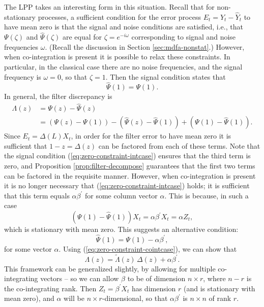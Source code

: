 \documentclass[a4paper]{book}
\begin{document}
 The LPP takes an interesting form in this situation. Recall that for non-stationary 
 processes, a sufficient condition for the error process $E_t = Y_t - \widehat{Y}_t$ 
 to have mean zero is that the signal and noise conditions are satisfied, 
 i.e., that $\Psi (\zeta)$ and $\widehat{\Psi} (\zeta)$ are equal for 
 $\zeta = e^{- i \omega}$  corresponding to signal and noise frequencies $\omega$. 
 (Recall the discussion in Section \ref{sec:mdfa-nonstat}.)  However, when 
 co-integration is present it is possible to relax these constraints.
 In particular, in the classical case there are no noise frequencies, and the
  signal frequency is $\omega = 0$, so that $\zeta =1$.  Then the signal condition states
  that
  \begin{equation}
  \label{eq:zero-constraint-intcase}
   \widehat{\Psi} (1) = \Psi (1).
  \end{equation}
  In general, the filter discrepancy is
\begin{align*}
 \Lambda (z) & =  \Psi (z) - \widehat{\Psi} (z) \\
  & = \left( \Psi (z) - \Psi (1) \right) 
   - \left( \widehat{\Psi} (z) - \widehat{\Psi} (1) \right) +
    \left( \Psi (1) - \widehat{\Psi} (1) \right).
  \end{align*}
 Since $E_t = \Delta (L) X_t$, in order for the  filter error to have mean zero
  it is sufficient that  $1-z = \Delta (z)$ can be factored from each of these terms.
  Note that the signal condition (\ref{eq:zero-constraint-intcase}) ensures
  that the third term is zero, and 
  Proposition \ref{prop:filter-decompose} guarantees that the first two terms can
  be factored in the requisite manner.  However, when co-integration is present 
  it is no longer necessary that (\ref{eq:zero-constraint-intcase}) holds; it is sufficient
  that this term equals $\alpha \beta^{\prime}$ for some column vector $\alpha$.
  This is because, in such a case
\[
    \left( \Psi (1) - \widehat{\Psi} (1) \right) X_t 
    = \alpha \beta^{\prime} X_t = \alpha Z_t,
\]
  which is stationary with mean zero.  This suggests an alternative condition:
 \begin{equation}
  \label{eq:zero-constraint-cointcase}
   \widehat{\Psi} (1) = \Psi (1) - \alpha \beta^{\prime}, 
  \end{equation}
  for some vector $\alpha$. Using (\ref{eq:zero-constraint-cointcase}), we can show that
\begin{equation}
\label{eq:lambda-delta-alpha}
 \Lambda (z) = \widetilde{\Lambda} (z) \, \Delta (z) + \alpha \beta^{\prime}.
\end{equation}
 This framework can be generalized slightly, by allowing for multiple co-integrating
  vectors -- so we can allow $\beta$ to be of dimension
  $n \times r$, where $n-r$ is the co-integrating rank.
  Then $Z_t = \beta^{\prime} X_t$ has dimension $r$ (and is stationary with mean zero),
  and $\alpha$ will 
  be $n \times r$-dimensional, so that $\alpha \beta^{\prime}$ is $n \times n$ of rank $r$.
  
\end{document}
